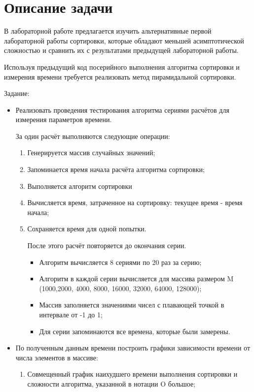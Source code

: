 \documentclass[12pt, a4paper]{report}
\begin{document}
	\section*{Описание задачи}
	\large
	В лабораторной работе предлагается изучить альтернативные первой лабораторной работы сортировки, которые обладают меньшей асимптотической сложностью и сравнить их с результатами предыдущей лабораторной работы. \par
	Используя предыдущий код посерийного выполнения алгоритма сортировки и измерения времени требуется реализовать метод пирамидальной сортировки. \par
	Задание:
	\begin{itemize}
		\item Реализовать проведения тестирования алгоритма сериями расчётов для измерения параметров времени. \par
		За один расчёт выполняются следующие операции:
		\begin{enumerate}
			\item Генерируется массив случайных значений;
			\item Запоминается время начала расчёта алгоритма сортировки;
			\item Выполняется алгоритм сортировки
			\item Вычисляется время, затраченное на сортировку: текущее время - время начала;
			\item Сохраняется время для одной попытки. \par
			После этого расчёт повторяется до окончания серии.
			\begin{itemize}
				\item Алгоритм вычисляется 8 сериями по 20 раз за серию;
				\item Алгоритм в каждой серии вычисляется для массива размером M (1000,2000, 4000, 8000, 16000, 32000, 64000, 128000);
				\item Массив заполняется значениями чисел с плавающей точкой в интервале от -1 до 1;
				\item Для серии запоминаются все времена, которые были замерены.
			\end{itemize}
		\end{enumerate}
		\item По полученным данным времени построить графики зависимости времени от числа элементов в массиве:
		\begin{enumerate}
			\item Совмещенный график наихудшего времени выполнения сортировки и сложности алгоритма, указанной в нотации O большое; \par

\end{enumerate}
\end{itemize}
\end{document}
